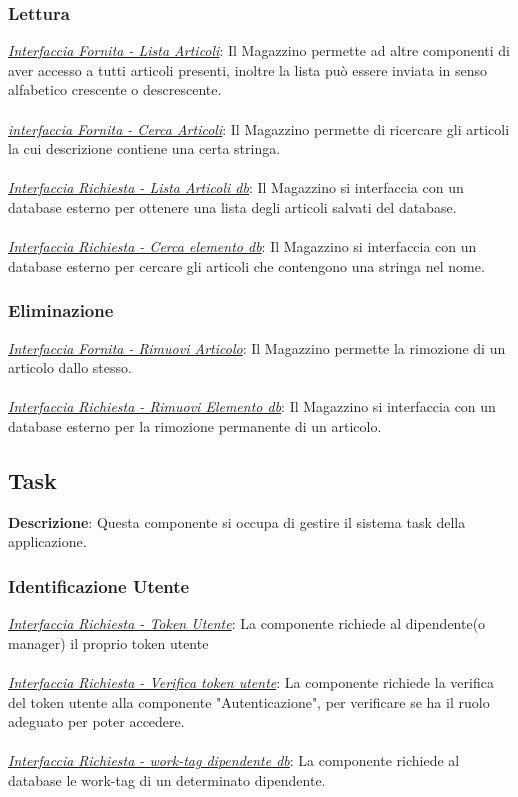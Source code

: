 \documentclass{report}
\begin{document}
\subsubsection*{\indent \indent Lettura}
\uline{\textit{Interfaccia Fornita - Lista Articoli}}:
Il Magazzino permette ad altre componenti di aver accesso a tutti articoli presenti, inoltre la lista può essere inviata in senso alfabetico crescente o descrescente.\\ \\
\uline{\textit{interfaccia Fornita - Cerca Articoli}}:
Il Magazzino permette di ricercare gli articoli la cui descrizione contiene una certa stringa.\\ \\
\textcolor{Database}{\uline{\textit{Interfaccia Richiesta - Lista Articoli db}}}:
Il Magazzino si interfaccia con un database esterno per ottenere una lista degli articoli salvati del database.\\ \\
\textcolor{Database}{\uline{\textit{Interfaccia Richiesta - Cerca elemento db}}}:
Il Magazzino si interfaccia con un database esterno per cercare gli articoli che contengono una stringa nel nome.
\subsubsection*{\indent \indent Eliminazione}
\uline{\textit{Interfaccia Fornita - Rimuovi Articolo}}:
Il Magazzino permette la rimozione di un articolo dallo stesso.\\ \\
\textcolor{Database}{\uline{\textit{Interfaccia Richiesta - Rimuovi Elemento db}}}:
Il Magazzino si interfaccia con un database esterno per la rimozione permanente di un articolo.
\subsection*{Task}

\textbf{Descrizione}: Questa componente si occupa di gestire il sistema task della applicazione.
\subsubsection*{\indent \indent Identificazione Utente}
\textcolor{Auth}{\uline{\textit{Interfaccia Richiesta - Token Utente}}}:
La componente richiede al dipendente(o manager) il proprio token utente \\ \\
\textcolor{Auth}{\uline{\textit{Interfaccia Richiesta - Verifica token utente}}}: 
La componente richiede la verifica del token utente alla componente "Autenticazione", per verificare se ha il ruolo adeguato per poter accedere. \\ \\ 
\textcolor{Database}{\uline{\textit{Interfaccia Richiesta - work-tag dipendente db}}}: 
La componente richiede al database le work-tag di un determinato dipendente. 
\end{document}
